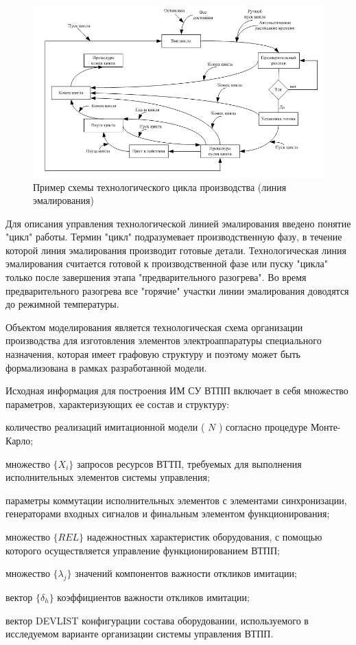 \begin{figure}[H]
	\includegraphics[scale=0.8]{images/part7/chapter_enterprise/line_ex.png}
	\caption{Пример схемы технологического цикла производства (линия эмалирования)}
	\label{fig:line_ex}
\end{figure}


Для описания управления технологической линией эмалирования введено понятие "цикл" работы. Термин "цикл" подразумевает производственную фазу, в течение которой линия эмалирования производит готовые детали.
Технологическая линия эмалирования считается готовой к производственной фазе или пуску "цикла" только после завершения этапа "предварительного разогрева". Во время предварительного разогрева все "горячие" участки линии эмалирования доводятся до режимной температуры.

Объектом моделирования является технологическая схема организации производства для изготовления элементов электроаппаратуры специального назначения, которая имеет графовую структуру и поэтому может быть формализована в рамках разработанной модели.

Исходная информация для построения ИМ СУ ВТПП включает в себя множество параметров, характеризующих ее состав и структуру:
\begin{textitemize}
    \item количество реализаций имитационной модели ( $N$ ) согласно процедуре Монте-Карло;
    \item множество $\{X_i\}$ запросов ресурсов ВТТП, требуемых для выполнения исполнительных элементов системы управления;
    \item параметры коммутации исполнительных элементов с элементами синхронизации, генераторами входных сигналов и финальным элементом функционирования;
    \item множество $\{REL\}$ надежностных характеристик оборудования, с помощью которого осуществляется управление функционированием ВТПП;
    \item множество $\{ \lambda_j \}$ значений компонентов важности откликов имитации;
    \item вектор $\{ \delta_h \}$ коэффициентов важности откликов имитации;
    \item вектор {DEVLIST} конфигурации состава оборудовании, используемого в исследуемом варианте организации системы управления ВТПП.
\end{textitemize}

